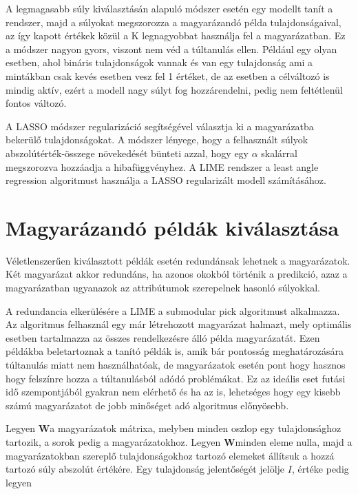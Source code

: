 A legmagasabb súly kiválasztásán alapuló módszer esetén egy modellt tanít a rendszer, majd a súlyokat megszorozza a magyarázandó példa tulajdonságaival, az így kapott értékek közül a K legnagyobbat használja fel a magyarázatban. Ez a módszer nagyon gyors, viszont nem véd a túltanulás ellen. Például egy olyan esetben, ahol bináris tulajdonságok vannak és van egy tulajdonság ami a mintákban csak kevés esetben vesz fel 1 értéket, de az esetben a célváltozó is mindig aktív, ezért a modell nagy súlyt fog hozzárendelni, pedig nem feltétlenül fontos változó. 

A LASSO módszer regularizáció segítségével választja ki a magyarázatba bekerülő tulajdonságokat. A módszer lényege, hogy a felhasznált súlyok abszolútérték-összege növekedését bünteti azzal, hogy egy $\alpha$ skalárral megszorozva hozzáadja a hibafüggvényhez. A LIME rendszer a least angle regression algoritmust használja a LASSO regularizált modell számításához.

\section{Magyarázandó példák kiválasztása}

Véletlenszerűen kiválasztott példák esetén redundánsak lehetnek a magyarázatok. Két magyarázat akkor redundáns, ha azonos okokból történik a predikció, azaz a magyarázatban ugyanazok az attribútumok szerepelnek hasonló súlyokkal. 

A redundancia elkerülésére a LIME a submodular pick algoritmust alkalmazza. Az algoritmus felhasznál egy már létrehozott magyarázat halmazt, mely optimális esetben tartalmazza az összes rendelkezésre álló példa magyarázatát. Ezen példákba beletartoznak a tanító példák is, amik bár pontosság meghatározására túltanulás miatt nem használhatóak, de magyarázatok esetén pont hogy hasznos hogy felszínre hozza a túltanulásból adódó problémákat. Ez az ideális eset futási idő szempontjából gyakran nem elérhető és ha az is, lehetséges hogy egy kisebb számú magyarázatot de jobb minőséget adó algoritmus előnyösebb.

\newcommand{\W}{\ensuremath{\boldsymbol W}}

Legyen \W a magyarázatok mátrixa, melyben minden oszlop egy tulajdonsághoz tartozik, a sorok pedig a magyarázatokhoz. Legyen \W minden eleme nulla, majd a magyarázatokban szereplő tulajdonságokhoz tartozó elemeket állítsuk a hozzá tartozó súly abszolút értékére. Egy tulajdonság jelentőségét jelölje $I$, értéke pedig legyen

